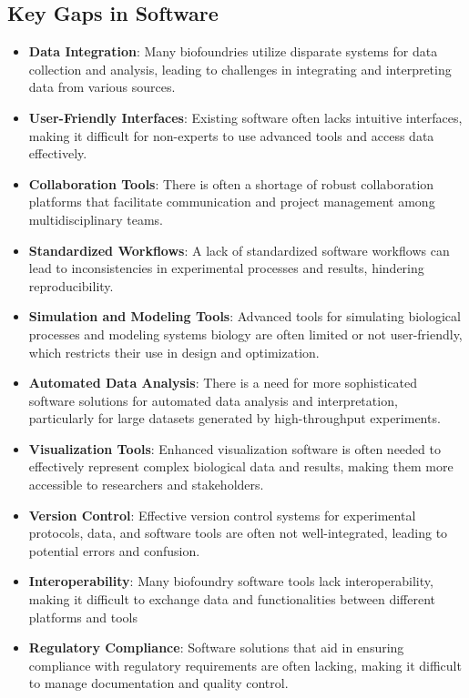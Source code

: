 \documentclass[
  letterpaper,
]{book}
\providecommand{\tightlist}{%
  \setlength{\itemsep}{0pt}\setlength{\parskip}{0pt}}\usepackage{longtable,booktabs,array}
\begin{document}
\subsection{Key Gaps in Software}\label{key-gaps-in-software}

\begin{itemize}
\tightlist
\item
  \textbf{Data Integration}: Many biofoundries utilize disparate systems
  for data collection and analysis, leading to challenges in integrating
  and interpreting data from various sources.
\item
  \textbf{User-Friendly Interfaces}: Existing software often lacks
  intuitive interfaces, making it difficult for non-experts to use
  advanced tools and access data effectively.
\item
  \textbf{Collaboration Tools}: There is often a shortage of robust
  collaboration platforms that facilitate communication and project
  management among multidisciplinary teams.
\item
  \textbf{Standardized Workflows}: A lack of standardized software
  workflows can lead to inconsistencies in experimental processes and
  results, hindering reproducibility.
\item
  \textbf{Simulation and Modeling Tools}: Advanced tools for simulating
  biological processes and modeling systems biology are often limited or
  not user-friendly, which restricts their use in design and
  optimization.
\item
  \textbf{Automated Data Analysis}: There is a need for more
  sophisticated software solutions for automated data analysis and
  interpretation, particularly for large datasets generated by
  high-throughput experiments.
\item
  \textbf{Visualization Tools}: Enhanced visualization software is often
  needed to effectively represent complex biological data and results,
  making them more accessible to researchers and stakeholders.
\item
  \textbf{Version Control}: Effective version control systems for
  experimental protocols, data, and software tools are often not
  well-integrated, leading to potential errors and confusion.
\item
  \textbf{Interoperability}: Many biofoundry software tools lack
  interoperability, making it difficult to exchange data and
  functionalities between different platforms and tools
\item
  \textbf{Regulatory Compliance}: Software solutions that aid in
  ensuring compliance with regulatory requirements are often lacking,
  making it difficult to manage documentation and quality control.
\end{itemize}
\end{document}
